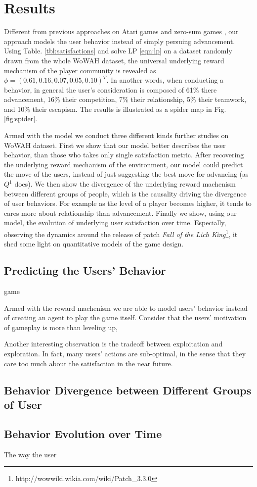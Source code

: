 \documentclass[a4paper]{article}
\begin{document}
\section{Results}

Different from previous approaches on Atari games \cite{} and zero-sum games \cite{}, our approach models the user behavior instead of simply persuing advancement. Using Table. \ref{tbl:satisfactions} and solve LP \eqref{eqn:lp} on a dataset randomly drawn from the whole WoWAH dataset, the universal underlying reward mechanism of the player community is revealed as $\phi=(0.61, 0.16, 0.07, 0.05, 0.10)^T$. In another words, when conducting a behavior, in general the user's consideration is composed of 61\% there advancement, 16\% their competition, 7\% their relationship, 5\% their teamwork, and 10\% their escapism. The results is illustrated as a spider map in Fig. \ref{fig:spider}.

Armed with the model we conduct three different kinds further studies on WoWAH dataset. First we show that our model better describes the user behavior, than those who takes only single satisfaction metric. After recovering the underlying reward mechanism of the environment, our model could predict the move of the users, instead of just suggesting the best move for advancing (as $Q^1$ does). We then show the divergence of the underlying reward machenism between different groups of people, which is the causality driving the divergence of user behaviors. For example as the level of a player becomes higher, it tends to cares more about relationship than advancement. Finally we show, using our model, the evolution of underlying user satisfaction over time. Especially, observing the dynamics around the release of patch \textit{Fall of the Lich King}\footnote{http://wowwiki.wikia.com/wiki/Patch\_3.3.0}, it shed some light on quantitative models of the game design.

\subsection{Predicting the Users' Behavior}

game



Armed with the reward machenism we are able to model users' behavior instead of creating an agent to play the game itself. Consider that the users' motivation of gameplay is more than leveling up, 

Another interesting observation is the tradeoff between exploitation and exploration. In fact, many users' actions are sub-optimal, in the sense that they care too much about the satisfaction in the near future.

\subsection{Behavior Divergence between Different Groups of User}

\subsection{Behavior Evolution over Time}

The way the user 
\end{document}
